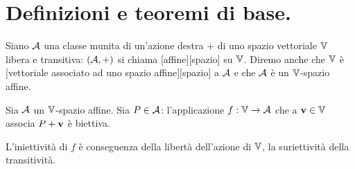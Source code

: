 \section{Definizioni e teoremi di base.}\label{DefinizioniETeoremiDiBase}
\begin{Definition}
	Siano $\mathcal{A}$ una classe munita di un'azione destra $+$ di uno spazio vettoriale $\mathbb{V}$ libera e transitiva: $(\mathcal{A},+)$ si chiama [affine][spazio] su $\mathbb{V}$. Diremo anche che $\mathbb{V}$ \`e [vettoriale associato ad uno spazio affine][spazio] a $\mathcal{A}$ e che $\mathcal{A}$ \`e un $\mathbb{V}$-spazio affine.
\end{Definition}
\begin{Theorem}
	Sia $\mathcal{A}$ un $\mathbb{V}$-spazio affine. Sia $P \in \mathcal{A}$: l'applicazione $f: \mathbb{V} \rightarrow \mathcal{A}$ che a $\mathbf{v} \in \mathbb{V}$ associa $P + \mathbf{v}$ \`e biettiva.
\end{Theorem}
\Proof L'iniettivit\`a di $f$ \`e conseguenza della libert\`a dell'azione di $\mathbb{V}$, la suriettivit\`a della transitivit\`a. \EndProof
